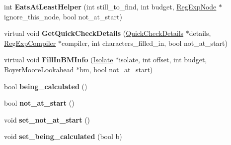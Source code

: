 \begin{DoxyCompactItemize}
\item 
int {\bfseries Eats\+At\+Least\+Helper} (int still\+\_\+to\+\_\+find, int budget, \hyperlink{classv8_1_1internal_1_1_reg_exp_node}{Reg\+Exp\+Node} $\ast$ignore\+\_\+this\+\_\+node, bool not\+\_\+at\+\_\+start)\hypertarget{classv8_1_1internal_1_1_choice_node_afcd5ff9141d54e2d163a60a66cb3abbd}{}\label{classv8_1_1internal_1_1_choice_node_afcd5ff9141d54e2d163a60a66cb3abbd}

\item 
virtual void {\bfseries Get\+Quick\+Check\+Details} (\hyperlink{classv8_1_1internal_1_1_quick_check_details}{Quick\+Check\+Details} $\ast$details, \hyperlink{classv8_1_1internal_1_1_reg_exp_compiler}{Reg\+Exp\+Compiler} $\ast$compiler, int characters\+\_\+filled\+\_\+in, bool not\+\_\+at\+\_\+start)\hypertarget{classv8_1_1internal_1_1_choice_node_a7e49411bc661f7902bc9c8d048fbc265}{}\label{classv8_1_1internal_1_1_choice_node_a7e49411bc661f7902bc9c8d048fbc265}

\item 
virtual void {\bfseries Fill\+In\+B\+M\+Info} (\hyperlink{classv8_1_1internal_1_1_isolate}{Isolate} $\ast$isolate, int offset, int budget, \hyperlink{classv8_1_1internal_1_1_boyer_moore_lookahead}{Boyer\+Moore\+Lookahead} $\ast$bm, bool not\+\_\+at\+\_\+start)\hypertarget{classv8_1_1internal_1_1_choice_node_ab5462f4a8a3616b174069b43ab87cadc}{}\label{classv8_1_1internal_1_1_choice_node_ab5462f4a8a3616b174069b43ab87cadc}

\item 
bool {\bfseries being\+\_\+calculated} ()\hypertarget{classv8_1_1internal_1_1_choice_node_a424ff01754676f5bac9b7e5356332dc3}{}\label{classv8_1_1internal_1_1_choice_node_a424ff01754676f5bac9b7e5356332dc3}

\item 
bool {\bfseries not\+\_\+at\+\_\+start} ()\hypertarget{classv8_1_1internal_1_1_choice_node_ac196fd8c0df4d1676a23fed33ad460c6}{}\label{classv8_1_1internal_1_1_choice_node_ac196fd8c0df4d1676a23fed33ad460c6}

\item 
void {\bfseries set\+\_\+not\+\_\+at\+\_\+start} ()\hypertarget{classv8_1_1internal_1_1_choice_node_a43edce21f575aebdb5417794138043be}{}\label{classv8_1_1internal_1_1_choice_node_a43edce21f575aebdb5417794138043be}

\item 
void {\bfseries set\+\_\+being\+\_\+calculated} (bool b)\hypertarget{classv8_1_1internal_1_1_choice_node_a756fc92efb374945d6584a8f68ba9e1f}{}\label{classv8_1_1internal_1_1_choice_node_a756fc92efb374945d6584a8f68ba9e1f}


\end{DoxyCompactItemize}
